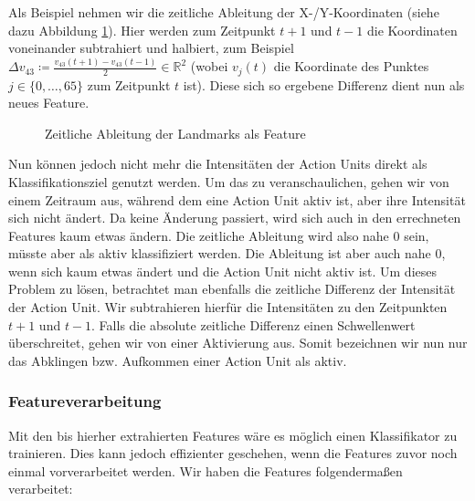 Als Beispiel nehmen wir die zeitliche Ableitung der X-/Y-Koordinaten (siehe dazu Abbildung \ref{fig:timediff}).
Hier werden zum Zeitpunkt $t+1$ und $t-1$ die Koordinaten voneinander
subtrahiert und halbiert, zum Beispiel $\Delta v_{43} \coloneqq \frac{v_{43}(t+1) - v_{43}(t-1)}{2}\in\mathbb{R}^2$ (wobei $v_{j}(t)$ die Koordinate des Punktes $j\in\{0,\ldots,65\}$ zum Zeitpunkt $t$ ist).
Diese sich so ergebene Differenz dient nun als neues Feature.

\begin{figure}
  \center

\caption{Zeitliche Ableitung der Landmarks als Feature}
\label{fig:timediff}
\end{figure}

Nun können jedoch nicht mehr die Intensitäten der Action Units direkt als
Klassifikationsziel genutzt werden.
Um das zu veranschaulichen, gehen wir von einem Zeitraum aus, während dem eine
Action Unit aktiv ist, aber ihre Intensität sich nicht ändert.
Da keine Änderung passiert, wird sich auch in den errechneten Features kaum etwas
ändern. Die zeitliche Ableitung wird also nahe $0$ sein, müsste aber als aktiv
klassifiziert werden. Die Ableitung ist aber auch nahe $0$, wenn sich kaum etwas
ändert und die Action Unit nicht aktiv ist.
Um dieses Problem zu lösen, betrachtet man ebenfalls die zeitliche Differenz der
Intensität der Action Unit. Wir subtrahieren hierfür die Intensitäten zu den
Zeitpunkten $t+1$ und $t-1$. Falls die absolute zeitliche Differenz einen
Schwellenwert überschreitet, gehen wir von einer Aktivierung aus. Somit bezeichnen wir nun nur das Abklingen bzw. Aufkommen einer Action Unit als aktiv.

\subsubsection{Featureverarbeitung}
Mit den bis hierher extrahierten Features wäre es möglich einen Klassifikator zu trainieren. Dies kann jedoch effizienter geschehen,
wenn die Features zuvor noch einmal vorverarbeitet werden. Wir haben die Features folgendermaßen verarbeitet:


